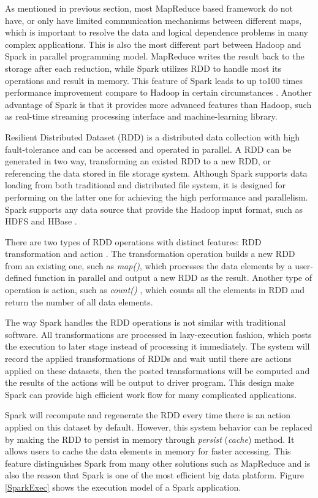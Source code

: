 As mentioned in previous section, most MapReduce based framework do not have, or only have limited communication mechanisms between different maps, which is important to resolve the data and logical dependence problems in many complex applications. This is also the most different part between Hadoop and Spark in parallel programming model. MapReduce writes the result back to the storage after each reduction, while Spark utilizes RDD to handle most its operations and result in memory. This feature of Spark leads to up to100 times performance improvement compare to Hadoop in certain circumstances \cite{ApacheSpark}. Another advantage of Spark is that it provides more advanced features than Hadoop, such as real-time streaming processing interface and machine-learning library.

Resilient Distributed Dataset (RDD) is a distributed data collection with high fault-tolerance and can be accessed and operated in parallel. A RDD can be generated in two way, transforming an existed RDD to a new RDD, or referencing the data stored in file storage system. Although Spark supports data loading from both traditional and distributed file system, it is designed for performing on the latter one for achieving the high performance and parallelism. Spark supports any data source that provide the Hadoop input format, such as HDFS and HBase \cite{ApacheSpark}.

There are two types of RDD operations with distinct features: RDD transformation and action \cite{ApacheSpark}. The transformation operation builds a new RDD from an existing one, such as \emph{map()}, which processes the data elements by a user-defined function in parallel and output a new RDD as the result. Another type of operation is action, such as \emph{count()} , which counts all the elements in RDD and return the number of all data elements. 

The way Spark handles the RDD operations is not similar with traditional software. All transformations are processed in lazy-execution fashion, which posts the execution to later stage instead of processing it immediately. The system will record the applied transformations of RDDs and wait until there are actions applied on these datasets, then the posted transformations will be computed and the results of the actions will be output to driver program. This design make Spark can provide high efficient work flow for many complicated applications. 

Spark will recompute and regenerate the RDD every time there is an action applied on this dataset by default. However, this system behavior can be replaced by making the RDD to persist in memory through \emph{persist} (\emph{cache}) method. It allows users to cache the data elements in memory for faster accessing. This feature distinguishes Spark from many other solutions such as MapReduce and is also the reason that Spark is one of the most efficient big data platform. Figure \ref{SparkExec} shows the execution model of a Spark application.

